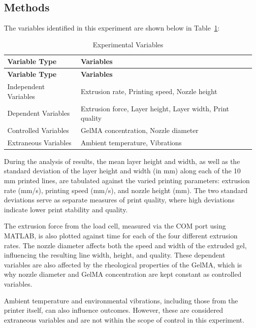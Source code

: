 \subsection{Methods}
The variables identified in this experiment are shown below in Table~\ref{tab:variables}:
\begin{longtable}{|>{\raggedright\arraybackslash}p{4cm}|>{\raggedright\arraybackslash}p{10cm}|}
\caption{Experimental Variables} \label{tab:variables} \\
\hline
\textbf{Variable Type} & \textbf{Variables} \\
\hline
\endfirsthead

\hline
\textbf{Variable Type} & \textbf{Variables} \\
\hline
\endhead

Independent Variables & Extrusion rate, Printing speed, Nozzle height \\
Dependent Variables   & Extrusion force, Layer height, Layer width, Print quality \\
Controlled Variables  & GelMA concentration, Nozzle diameter \\
Extraneous Variables  & Ambient temperature, Vibrations \\
\hline
\end{longtable}


During the analysis of results, the mean layer height and width, as well as the standard deviation of the layer height and width (in mm) along each of the 10\,mm printed lines, are tabulated against the varied printing parameters: extrusion rate (mm/s), printing speed (mm/s), and nozzle height (mm). The two standard deviations serve as separate measures of print quality, where high deviations indicate lower print stability and quality.

The extrusion force from the load cell, measured via the COM port using MATLAB, is also plotted against time for each of the four different extrusion rates. The nozzle diameter affects both the speed and width of the extruded gel, influencing the resulting line width, height, and quality. These dependent variables are also affected by the rheological properties of the GelMA, which is why nozzle diameter and GelMA concentration are kept constant as controlled variables.

Ambient temperature and environmental vibrations, including those from the printer itself, can also influence outcomes. However, these are considered extraneous variables and are not within the scope of control in this experiment.

